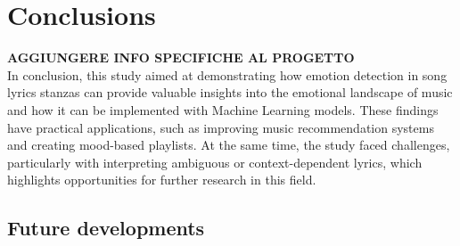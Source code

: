 \chapter*{Conclusions}
\label{ch:conclusions}

\textbf{AGGIUNGERE INFO SPECIFICHE AL PROGETTO}\\

In conclusion, this study aimed at demonstrating how emotion detection in song lyrics stanzas can provide valuable insights into the emotional landscape of music and how it can be implemented with Machine Learning models. 
These findings have practical applications, such as improving music recommendation systems and creating mood-based playlists. 
At the same time, the study faced challenges, particularly with interpreting ambiguous or context-dependent lyrics, which highlights opportunities for further research in this field.


\section*{Future developments}